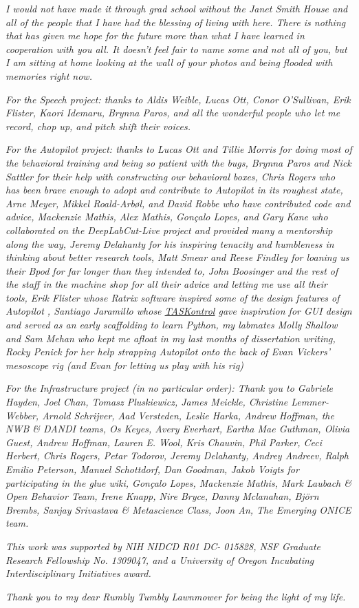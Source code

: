 \begin{acknowledgements}
\textit{I would not have made it through grad school without the Janet Smith House and all of the people that I have had the blessing of living with here. There is nothing that has given me hope for the future more than what I have learned in cooperation with you all. It doesn't feel fair to name some and not all of you, but I am sitting at home looking at the wall of your photos and being flooded with memories right now.}

\textit{For the Speech project: thanks to Aldis Weible, Lucas Ott, Conor O'Sullivan, Erik Flister, Kaori Idemaru, Brynna Paros, and all the wonderful people who let me record, chop up, and pitch shift their voices.}

\textit{For the Autopilot project: thanks to Lucas Ott and Tillie Morris for doing most of the behavioral training and being so patient with the bugs, Brynna Paros and Nick Sattler for their help with constructing our behavioral boxes, Chris Rogers who has been brave enough to adopt and contribute to Autopilot in its roughest state, Arne Meyer, Mikkel Roald-Arbøl, and David Robbe who have contributed code and advice, Mackenzie Mathis, Alex Mathis, Gonçalo Lopes, and Gary Kane who collaborated on the DeepLabCut-Live project and provided many a mentorship along the way, Jeremy Delahanty for his inspiring tenacity and humbleness in thinking about better research tools, Matt Smear and Reese Findley for loaning us their Bpod for far longer than they intended to, John Boosinger and the rest of the staff in the machine shop for all their advice and letting me use all their tools, Erik Flister whose Ratrix software inspired some of the design features of Autopilot \citep{meierCollinearFeaturesImpair2011}, Santiago Jaramillo whose \href{https://github.com/sjara/taskontrol}{TASKontrol}\citep{jaramilloTASKontrol2022} gave inspiration for GUI design and served as an early scaffolding to learn Python, my labmates Molly Shallow and Sam Mehan who kept me afloat in my last months of dissertation writing, Rocky Penick for her help strapping Autopilot onto the back of Evan Vickers' mesoscope rig (and Evan for letting us play with his rig)}

\textit{For the Infrastructure project (in no particular order): Thank you to Gabriele Hayden, Joel Chan, Tomasz Pluskiewicz, James Meickle, Christine Lemmer-Webber, Arnold Schrijver, Aad Versteden, Leslie Harka, Andrew Hoffman, the NWB \& DANDI teams, Os Keyes, Avery Everhart, Eartha Mae Guthman, Olivia Guest, Andrew Hoffman, Lauren E. Wool, Kris Chauvin, Phil Parker, Ceci Herbert, Chris Rogers, Petar Todorov, Jeremy Delahanty, Andrey Andreev, Ralph Emilio Peterson, Manuel Schottdorf, Dan Goodman, Jakob Voigts for participating in the glue wiki, Gonçalo Lopes, Mackenzie Mathis, Mark Laubach \& Open Behavior Team, Irene Knapp, Nire Bryce, Danny Mclanahan, Björn Brembs, Sanjay Srivastava \& Metascience Class, Joon An, The Emerging ONICE team.}

\textit{This work was supported by NIH NIDCD R01 DC- 015828, NSF Graduate Research Fellowship No. 1309047, and a University of Oregon Incubating Interdisciplinary Initiatives award.}

\textit{Thank you to my dear Rumbly Tumbly Lawnmower for being the light of my life.}

\end{acknowledgements}